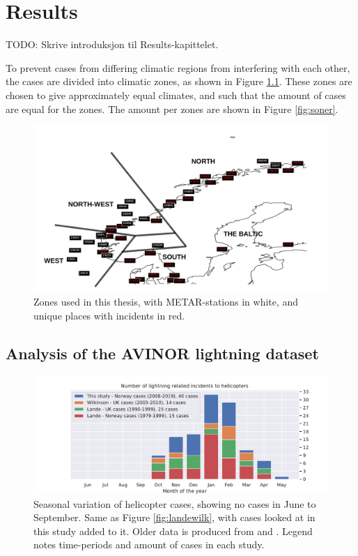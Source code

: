 \chapter{Results}
TODO: Skrive introduksjon til Results-kapittelet.

To prevent cases from differing climatic regions from interfering with each other, the cases are divided into climatic zones, as shown in Figure \ref{fig:Stationsmap}. These zones are chosen to give approximately equal climates, and such that the amount of cases are equal for the zones. The amount per zones are shown in Figure \ref{fig:soner}.

\begin{figure}
    \centering
    \includegraphics[width=\textwidth]{Figures/METARandHIT.pdf}
    \caption{Zones used in this thesis, with METAR-stations in white, and unique places with incidents in red.}
    \label{fig:Stationsmap}
\end{figure}

\section{Analysis of the AVINOR lightning dataset}
\begin{figure}
    \centering
    \includegraphics[width=\textwidth]{Figures/yearlydistribution.pdf}
    \caption{Seasonal variation of helicopter cases, showing no cases in June to September. Same as Figure \ref{fig:landewilk}, with cases looked at in this study added to it. Older data is produced from \cite{lande1999} and \cite{wilkinson2013}. Legend notes time-periods and amount of cases in each study. }
    \label{fig:yearlyvariation}
\end{figure}

